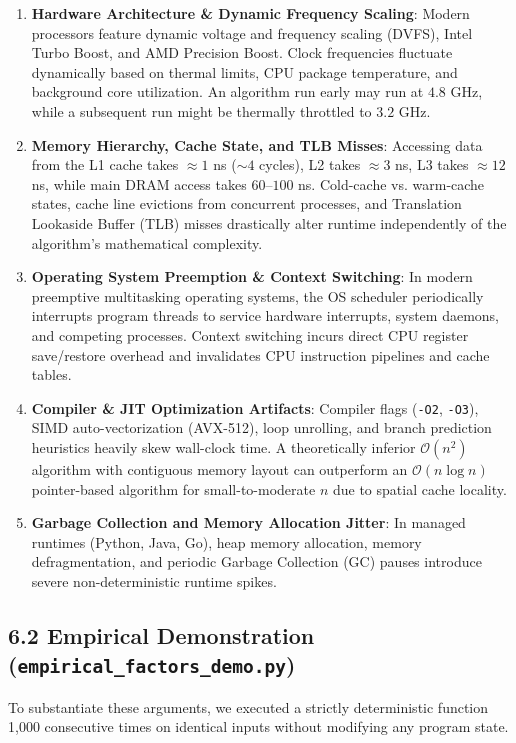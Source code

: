 \documentclass[12pt]{article}
\begin{document}
\begin{enumerate}
    \item \textbf{Hardware Architecture \& Dynamic Frequency Scaling}:
    Modern processors feature dynamic voltage and frequency scaling (DVFS), Intel Turbo Boost, and AMD Precision Boost. Clock frequencies fluctuate dynamically based on thermal limits, CPU package temperature, and background core utilization. An algorithm run early may run at $4.8$ GHz, while a subsequent run might be thermally throttled to $3.2$ GHz.
    
    \item \textbf{Memory Hierarchy, Cache State, and TLB Misses}:
    Accessing data from the L1 cache takes $\approx 1$ ns ($\sim 4$ cycles), L2 takes $\approx 3$ ns, L3 takes $\approx 12$ ns, while main DRAM access takes $60$--$100$ ns. Cold-cache vs. warm-cache states, cache line evictions from concurrent processes, and Translation Lookaside Buffer (TLB) misses drastically alter runtime independently of the algorithm's mathematical complexity.
    
    \item \textbf{Operating System Preemption \& Context Switching}:
    In modern preemptive multitasking operating systems, the OS scheduler periodically interrupts program threads to service hardware interrupts, system daemons, and competing processes. Context switching incurs direct CPU register save/restore overhead and invalidates CPU instruction pipelines and cache tables.
    
    \item \textbf{Compiler \& JIT Optimization Artifacts}:
    Compiler flags (\texttt{-O2}, \texttt{-O3}), SIMD auto-vectorization (AVX-512), loop unrolling, and branch prediction heuristics heavily skew wall-clock time. A theoretically inferior $\mathcal{O}(n^2)$ algorithm with contiguous memory layout can outperform an $\mathcal{O}(n \log n)$ pointer-based algorithm for small-to-moderate $n$ due to spatial cache locality.
    
    \item \textbf{Garbage Collection and Memory Allocation Jitter}:
    In managed runtimes (Python, Java, Go), heap memory allocation, memory defragmentation, and periodic Garbage Collection (GC) pauses introduce severe non-deterministic runtime spikes.
\end{enumerate}

\subsection*{6.2 Empirical Demonstration (\texttt{empirical\_factors\_demo.py})}
To substantiate these arguments, we executed a strictly deterministic function 1,000 consecutive times on identical inputs without modifying any program state.
\end{document}
